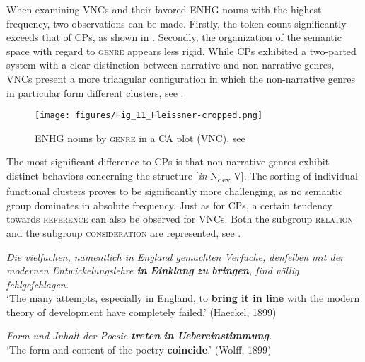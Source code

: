 \documentclass[output=paper,colorlinks,citecolor=brown]{langscibook}
\begin{document}
When examining VNCs and their favored ENHG nouns with the highest frequency, two observations can be made. Firstly, the token count significantly exceeds that of CPs, as shown in . Secondly, the organization of the semantic space with regard to \textsc{genre} appears less rigid. While CPs exhibited a two-parted system with a clear distinction between narrative and non-narrative genres, VNCs present a more triangular configuration in which the non-narrative genres in particular form different clusters, see .

\begin{figure}
    \centering
    \texttt{[image: figures/Fig\_11\_Fleissner-cropped.png]}
    \caption{ENHG nouns by \textsc{genre} in a CA plot (VNC), see }
    \label{fig:fleissner:9}
\end{figure}

The most significant difference to CPs is that non-narrative genres exhibit distinct behaviors concerning the structure [\textit{in} N\textsubscript{dev} V]. The sorting of individual functional clusters proves to be significantly more challenging, as no semantic group dominates in absolute frequency. Just as for CPs, a certain tendency towards \textsc{reference} can also be observed for VNCs. Both the subgroup \textsc{relation} and the subgroup \textsc{consideration} are represented, see .

\ea
\label{ex:fleissner:12}
{\itshape Die vielfachen, namentlich in England gemachten Verſuche, denſelben mit der modernen Entwickelungslehre \textbf{in} \textbf{Einklang} \textbf{zu} \textbf{bringen}, ſind völlig fehlgeſchlagen.}\\
\glt ‘The many attempts, especially in England, to \textbf{bring it in line} with the modern theory of development have completely failed.' \hfill (Haeckel, 1899)
\z 

\ea%
\label{ex:fleissner:13}
{\itshape Form und Jnhalt der Poesie \textbf{treten} \textbf{in} \textbf{Uebereinstimmung}.}\\
\glt ‘The form and content of the poetry \textbf{coincide}.' \hfill (Wolff, 1899)
\z
\end{document}
